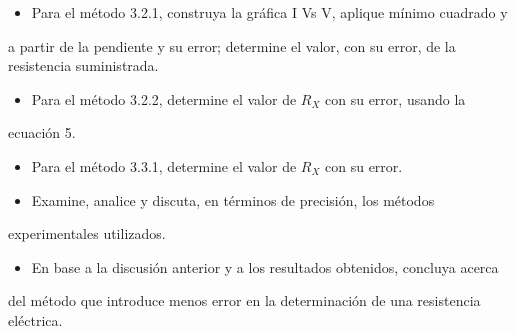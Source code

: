 \documentclass[11pt,a4paper]{article}
\begin{document}
\begin{itemize}[leftmargin=1.4em,itemsep=2pt,topsep=3pt]
  \item Para el método 3.2.1, construya la gráfica I Vs V, aplique mínimo cuadrado y
\end{itemize}

a partir de la pendiente y su error; determine el valor, con su error, de la resistencia suministrada.

\begin{itemize}[leftmargin=1.4em,itemsep=2pt,topsep=3pt]
  \item Para el método 3.2.2, determine el valor de $R_X$ con su error, usando la
\end{itemize}

ecuación 5.

\begin{itemize}[leftmargin=1.4em,itemsep=2pt,topsep=3pt]
  \item Para el método 3.3.1, determine el valor de $R_X$ con su error.
  \item Examine, analice y discuta, en términos de precisión, los métodos
\end{itemize}

experimentales utilizados.

\begin{itemize}[leftmargin=1.4em,itemsep=2pt,topsep=3pt]
  \item En base a la discusión anterior y a los resultados obtenidos, concluya acerca
\end{itemize}

del método que introduce menos error en la determinación de una resistencia eléctrica.
\end{document}
